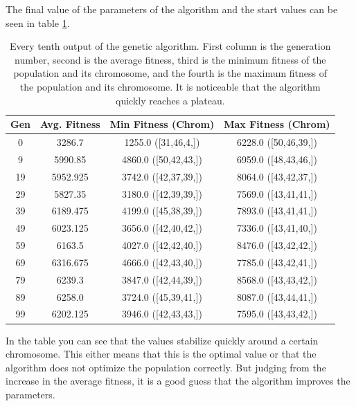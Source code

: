 \documentclass[conference,compsoc]{IEEEtran}
\begin{document}
The final value of the parameters of the algorithm and the start values can be seen in table \ref{tab:stateFinalVal}.
\begin{table}[h]
\begin{center}
\begin{tabular}{|c|c|c|c|}
\hline
Gen & Avg. Fitness& Min Fitness (Chrom)& Max Fitness (Chrom)\\
\hline
0 & 3286.7 & 1255.0 ([31,46,4,]) & 6228.0 ([50,46,39,])\\
\hline
9 & 5990.85 & 4860.0 ([50,42,43,]) & 6959.0 ([48,43,46,])\\
\hline
19 & 5952.925 & 3742.0 ([42,37,39,]) & 8064.0 ([43,42,37,])\\
\hline
29 & 5827.35 & 3180.0 ([42,39,39,]) & 7569.0 ([43,41,41,])\\
\hline
39 & 6189.475 & 4199.0 ([45,38,39,]) & 7893.0 ([43,41,41,])\\
\hline
49 & 6023.125 & 3656.0 ([42,40,42,]) & 7336.0 ([43,41,40,])\\
\hline
59 & 6163.5 & 4027.0 ([42,42,40,]) & 8476.0 ([43,42,42,])\\
\hline
69 & 6316.675 & 4666.0 ([42,43,40,]) & 7785.0 ([43,42,41,])\\
\hline
79 & 6239.3 & 3847.0 ([42,44,39,]) & 8568.0 ([43,43,42,])\\
\hline
89 & 6258.0 & 3724.0 ([45,39,41,]) & 8087.0 ([43,44,41,])\\
\hline
99 & 6202.125 & 3946.0 ([42,43,43,]) & 7595.0 ([43,43,42,])\\
\hline
\end{tabular}
\end{center}
\caption{Every tenth output of the genetic algorithm. First column is the generation number, second is the average fitness, third is the minimum fitness of the population and its chromosome, and the fourth is the maximum fitness of the population and its chromosome. It is noticeable that the algorithm quickly reaches a plateau.}
\label{tab:stateFinalVal}
\end{table}
In the table you can see that the values stabilize quickly around a certain chromosome. This either means that this is the optimal value or that the algorithm does not optimize the population correctly. 
But judging from the increase in the average fitness, it is a good guess that the algorithm improves the parameters.
\end{document}
